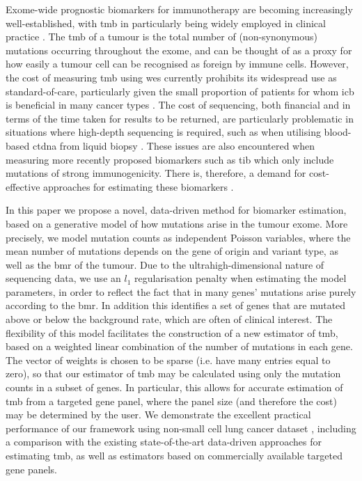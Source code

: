 \documentclass[10pt,twoside,openright]{report}
\begin{document}
Exome-wide prognostic biomarkers for immunotherapy are becoming increasingly well-established, with \acrfull{tmb} \citep{zhu_association_2019, cao_high_2019} in particularly being widely employed in clinical practice \citep{stenzinger_tumor_2019}. The \acrshort{tmb} of a tumour is the total number of (non-synonymous) mutations occurring throughout the exome, and can be thought of as a proxy for how easily a tumour cell can be recognised as foreign by immune cells. However, the cost of measuring \acrshort{tmb} using \acrfull{wes} \citep{sboner_real_2011} currently prohibits its widespread use as standard-of-care, particularly given the small proportion of patients for whom \acrshort{icb} is beneficial in many cancer types \citep{nowicki_mechanisms_2018}. The cost of sequencing, both financial and in terms of the time taken for results to be returned, are particularly problematic in situations where high-depth sequencing is required, such as when utilising blood-based \acrfull{ctdna} from liquid biopsy \citep{gandara_blood-based_2018}. These issues are also encountered when measuring more recently proposed biomarkers such as \acrfull{tib} \citep{wu_tumor_2019,turajlic_insertion-and-deletion-derived_2017} which only include mutations of strong immunogenicity. There is, therefore, a demand for cost-effective approaches for estimating these biomarkers \citep{fancello_tumor_2019}.

In this paper we propose a novel, data-driven method for biomarker estimation, based on a generative model of how mutations arise in the tumour exome.  More precisely, we model mutation counts as independent Poisson variables, where the mean number of mutations depends on the gene of origin and variant type, as well as the \acrfull{bmr} of the tumour. Due to the ultrahigh-dimensional nature of sequencing data, we use an $l_1$ regularisation penalty when estimating the model parameters, in order to reflect the fact that in many genes' mutations arise purely according to the \acrshort{bmr}. In addition this identifies a set of genes that are mutated above or below the background rate, which are often of clinical interest. The flexibility of this model facilitates the construction of a new estimator of \acrshort{tmb}, based on a weighted linear combination of the number of mutations in each gene. The vector of weights is chosen to be sparse (i.e. have many entries equal to zero), so that our estimator of \acrshort{tmb} may be calculated using only the mutation counts in a subset of genes. In particular, this allows for accurate estimation of \acrshort{tmb} from a targeted gene panel, where the panel size (and therefore the cost) may be determined by the user.  We demonstrate the excellent practical performance of our framework using non-small cell lung cancer dataset \citep{chalmers_analysis_2017}, including a comparison with the existing state-of-the-art data-driven approaches for estimating \acrshort{tmb}, as well as estimators based on commercially available targeted gene panels.  
\end{document}
